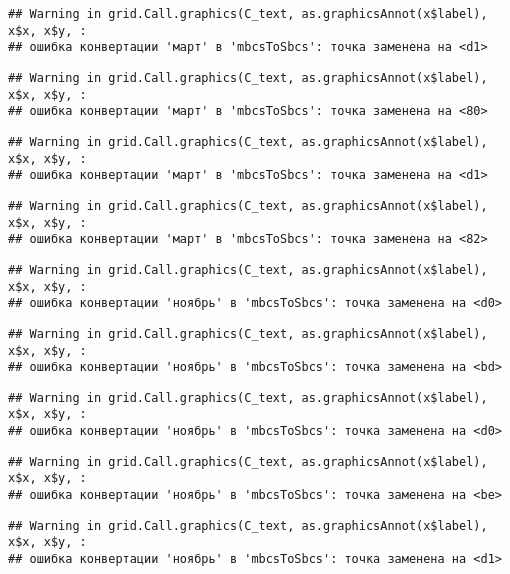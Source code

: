 \documentclass[
]{article}
\begin{document}
\begin{verbatim}
## Warning in grid.Call.graphics(C_text, as.graphicsAnnot(x$label), x$x, x$y, :
## ошибка конвертации 'март' в 'mbcsToSbcs': точка заменена на <d1>
\end{verbatim}

\begin{verbatim}
## Warning in grid.Call.graphics(C_text, as.graphicsAnnot(x$label), x$x, x$y, :
## ошибка конвертации 'март' в 'mbcsToSbcs': точка заменена на <80>
\end{verbatim}

\begin{verbatim}
## Warning in grid.Call.graphics(C_text, as.graphicsAnnot(x$label), x$x, x$y, :
## ошибка конвертации 'март' в 'mbcsToSbcs': точка заменена на <d1>
\end{verbatim}

\begin{verbatim}
## Warning in grid.Call.graphics(C_text, as.graphicsAnnot(x$label), x$x, x$y, :
## ошибка конвертации 'март' в 'mbcsToSbcs': точка заменена на <82>
\end{verbatim}

\begin{verbatim}
## Warning in grid.Call.graphics(C_text, as.graphicsAnnot(x$label), x$x, x$y, :
## ошибка конвертации 'ноябрь' в 'mbcsToSbcs': точка заменена на <d0>
\end{verbatim}

\begin{verbatim}
## Warning in grid.Call.graphics(C_text, as.graphicsAnnot(x$label), x$x, x$y, :
## ошибка конвертации 'ноябрь' в 'mbcsToSbcs': точка заменена на <bd>
\end{verbatim}

\begin{verbatim}
## Warning in grid.Call.graphics(C_text, as.graphicsAnnot(x$label), x$x, x$y, :
## ошибка конвертации 'ноябрь' в 'mbcsToSbcs': точка заменена на <d0>
\end{verbatim}

\begin{verbatim}
## Warning in grid.Call.graphics(C_text, as.graphicsAnnot(x$label), x$x, x$y, :
## ошибка конвертации 'ноябрь' в 'mbcsToSbcs': точка заменена на <be>
\end{verbatim}

\begin{verbatim}
## Warning in grid.Call.graphics(C_text, as.graphicsAnnot(x$label), x$x, x$y, :
## ошибка конвертации 'ноябрь' в 'mbcsToSbcs': точка заменена на <d1>
\end{verbatim}
\end{document}
